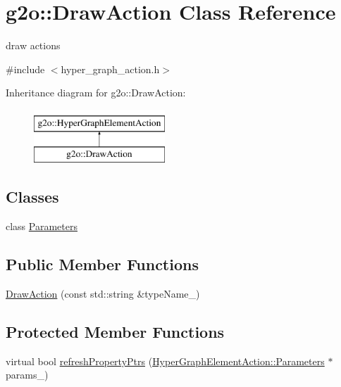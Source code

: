 \hypertarget{classg2o_1_1_draw_action}{}\section{g2o\+:\+:Draw\+Action Class Reference}
\label{classg2o_1_1_draw_action}


draw actions  




{\ttfamily \#include $<$hyper\+\_\+graph\+\_\+action.\+h$>$}

Inheritance diagram for g2o\+:\+:Draw\+Action\+:\begin{figure}[H]
\begin{center}
\leavevmode
\includegraphics[height=2.000000cm]{classg2o_1_1_draw_action}
\end{center}
\end{figure}
\subsection*{Classes}
\begin{DoxyCompactItemize}
\item 
class \mbox{\hyperlink{classg2o_1_1_draw_action_1_1_parameters}{Parameters}}
\end{DoxyCompactItemize}
\subsection*{Public Member Functions}
\begin{DoxyCompactItemize}
\item 
\mbox{\hyperlink{classg2o_1_1_draw_action_a6b876d6a30fa564176dc6a3caefa572e}{Draw\+Action}} (const std\+::string \&type\+Name\+\_\+)
\end{DoxyCompactItemize}
\subsection*{Protected Member Functions}
\begin{DoxyCompactItemize}
\item 
virtual bool \mbox{\hyperlink{classg2o_1_1_draw_action_a9556cd6f8d1f842d45e046e1770699b0}{refresh\+Property\+Ptrs}} (\mbox{\hyperlink{structg2o_1_1_hyper_graph_element_action_1_1_parameters}{Hyper\+Graph\+Element\+Action\+::\+Parameters}} $\ast$params\+\_\+)
\end{DoxyCompactItemize}
